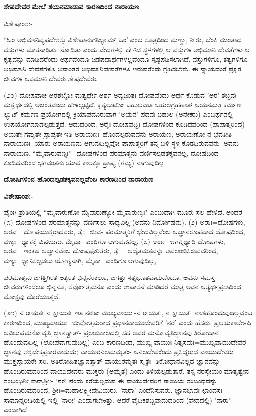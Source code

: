 \begin{center}
\textbf{ಶೇಷದೇವರ ಮೇಲೆ ಶಯನಮಾಡುವ ಕಾರಣದಿಂದ ನಾರಾಯಣ}
\end{center}

\noindent
ವಿಶೇಷಾಂಶ:-

“ಓಂ ಅಭಿಮಾನಿವ್ಯಪದೇಶಸ್ತು ವಿಶೇಷಾನುಗತಿಭ್ಯಾಮ್ ಓಂ' ಎಂಬ ಸೂತ್ರದಿಂದ ಮಣ್ಣು, ನೀರು, ಬೆಂಕಿ ಮುಂತಾದ ವಸ್ತುಗಳು ಮಾತನಾಡಿತು. ನೋಡಿತು ಎಂದು ವೇದಗಳಲ್ಲಿ ಹೇಳಿದ ಸ್ಥಳಗಳಲ್ಲಿ ಆ ವಸ್ತುಗಳ ಅಭಿಮಾನಿ ದೇವತೆಗಳು ಆ ಕೃತ್ಯವನ್ನು ಮಾಡಿದರೆಂದು ಅರ್ಥವೆಂದೂ ಜಡಪದಾರ್ಥಗಳಲ್ಲವೆಂದೂ ಸ್ಪಷ್ಟಪಡಿಸಲಾಗಿದೆ. ವಸ್ತುಗಳಿಗೂ, ತತ್ವಗಳಿಗೂ ಅಭಿಮಾನಿ ದೇವತೆಗಳೂ ಅವಾಂತರ ಅಭಿಮಾನಿದೇವತೆಗಳೂ ಇರುವರೆಂದು ಗ್ರಹಿಸಬೇಕು. ಈ ನ್ಯಾಯದಂತೆ ಪ್ರಕೃತ ಜೀವಗಳ ಅಭಿಮಾನಿ ದೇವರು ಶೇಷದೇವರು.

(೨೦) ದೋಷವಾಚ ಅರಶಬ್ದೋ ಮತ್ವರ್ಥೇ ಅರ್ಶ ಅದ್ಯಜಂತಃ-ದೋಷವೆಂದು ಅರ್ಥ ಕೊಡುವ 'ಅರ' ಶಬ್ದವು ಮತ್ವರ್ಥದಲ್ಲಿ ಅಜಂತವೆಂದು ಹೇಳಲ್ಪಟ್ಟಿದೆ. ಕೃತ್ಯಲುಟೋ ಬಹುಲಮಿತಿ ಬಹುಲಗ್ರಹಣಾತ್ ಅಯನಮಿತಿ ಕರ್ಮಣಿ ಲ್ಯುಟ್-ಕರ್ಮಣಿ ಪ್ರಯೋಗದಲ್ಲಿ ಕ್ರಿಯಾಪದವಿರುವಾಗ 'ಅಯನ' ಪದವು ಬಹುಲ (ಅನೇಕರು) ಎಂಬರ್ಥದಲ್ಲಿ ಉಪಯೋಗಮಾಡಲ್ಪಡುತ್ತದೆ. ಆದುದರಿಂದ, ಅರೈಃ ದೋಷವದ್ಭಿಃ-ದೋಷಗಳಿಂದ ಕೂಡಿದವರಿಂದ (ಪಾಪಾತ್ಮರಿಂದ) ಅಯತೇ ಗಮ್ಯತೇ ಪ್ರಾಪ್ಯತೇ ಇತಿ ಅರಾಯಣಃ--ಹೊಂದಲ್ಪಡುವವನು ಅರಾಯಣ, ಅರಾಯಣೋ ನ ಭವತೀತಿ ನಾರಾಯಣಃ- ಯಾರು ಅರಾಯಣನು ಆಗುವುದಿಲ್ಲವೋ-ಪಾಪಾತ್ಮರಿಗೆ ತನ್ನ ಬಳಿ ಸ್ಥಳ ಕೊಡದಿರುವವನು- ಅವನು ನಾರಾಯಣ. ``ಮೈವಾರುವಣ್ಯಃ''- ದೋಷಗಳಿಂದ ಪರಮಾತ್ಮನು ವರ್ಣಿಸಲ್ಪಡತಕ್ಕವನಲ್ಲ, ದೋಷದಿಂದ ಕೂಡಿದವರಿಂದ ಭಗವಂತನು ಯಾವ ಕಾಲಕ್ಕೂ ಪ್ರಾಪ್ಯ (ಗಮ್ಯ) ನಾಗುವುದಿಲ್ಲ.

\begin{center}
\textbf{ದೋಷಿಗಳಿಂದ ಹೊಂದಲ್ಪಡತಕ್ಕವನಲ್ಲವೆಂಬ ಕಾರಣದಿಂದ ನಾರಾಯಣ}
\end{center}

\noindent
\textbf{ವಿಶೇಷಾಂಶ:-}

ಪೈಂಗಿ ಶ್ರುತಿಯಲ್ಲಿ ``ಮೈವಾರುಣೋ ಮೈವಾರುಣ್ಯೋ ಮೈವಾರುಣ್ಯಃ" ಎಂಬುದಾಗಿ ಮೂರು ಸಲ ಹೇಳಿದೆ. ಅಂದರೆ (೧) ದೋಷಗಳಿಂದ ಪರಮಾತ್ಮನನ್ನು ವರ್ಣಿಸಲು ಸಾಧ್ಯವಿಲ್ಲ (ಅವನು ನಿರ್ದೋಷನು). (೨) ಅರಾಃ=ದೋಷಗಳು, ಅರವಃ=ದೋಷಯುಕ್ತರಾದವರು, ತೈಃ=ಜೀವ- ಪರಮಾತ್ಮರಿಗೆ ಭೇದವಿಲ್ಲವೆಂಬ ಅಜ್ಞಾನರೂಪವಾದ ದೋಷದಿಂದ, ವಣ್ಯಃ=ಧ್ಯಾನಕ್ಕೆ ವಿಷಯನು, ಮೈವಾ=ಎಂದಿಗೂ ಆಗುವವನಲ್ಲ. (೩) ಅರಾಃ=ಜಗನ್ನಿಥ್ಯಾದಿ ದೋಷಗಳು, ಅರವಃ=ಇಂತಹ ಅಜ್ಞಾನವೆಂಬ ದೋಷಪೂರಿತರು, ತೈಃ= ಅದೈತಮತವನ್ನು ಅವಲಂಬಿಸಿರುವವರಿಂದ, ವಣ್ಯಃ=ಧ್ಯಾನಿಸಲ್ಪಡಲು ಯೋಗ್ಯನಾಗಿ, ಮೈವಾ=ಎಂದಿಗೂ ಆಗುವುದಿಲ್ಲ,

ಪರಮಾತ್ಮನು ಜಗತ್ತಿಗಿಂತ ಅತ್ಯಂತ ಭಿನ್ನನೆಂತಲೂ, ಜಗತ್ತು ಸತ್ಯಭೂತವಾದುದೆಂದೂ, ಅವನು ಸಮಸ್ತ ಜೀವರುಗಳಿಂದಲೂ ಭಿನ್ನನೂ, ಸರ್ವೋತ್ತಮನೂ ಎಂದು ಉಪಾಸನೆ ಮಾಡಿದರೆ ಮಾತ್ರ ಅವನ ಅತ್ಯರ್ಥಪ್ರಸಾದಿಂದ ಮೋಕ್ಷವು ದೊರೆಯುತ್ತದೆ.

(೨೧) ನ ರೀಯತೇ ನ ಕ್ಷೀಯತೇ ಇತಿ ನರೋ ಮುಖ್ಯವಾಯುಃ-ನ ರೀಯತೇ, ನ ಕ್ಷೀಯತೆ=ನಾಶಹೊಂದುವುದಿಲ್ಲವೆಂಬ ಕಾರಣದಿಂದ, ಮುಖ್ಯವಾಯುಃ=ಜೀವೋತ್ತಮರಾದ ಪ್ರಧಾನವಾಯುದೇವರಿಗೆ 'ನರ' ಎಂದು ಹೆಸರು. ಪ್ರಲಯಕಾಲೇಽಪಿ ಅವಿಲುಪ್ತಮನೋವೃತ್ತಿ ಜ್ಞಾನತ್ವಾತ್- ಪ್ರಲಯಕಾಲದಲ್ಲಿ ಸಹ ಅವರ ಮನೋವೃತಿಜ್ಞಾನವು ತಿರೋಧಾನ ಹೊಂದುವುದಿಲ್ಲ (ಲೋಪವಾಗುವುದಿಲ್ಲ) ಎಂಬ ಕಾರಣದಿಂದ, ಮುಖ್ಯ ವಾಯುಃ ನಿತ್ಯಸಮಃ=ಮುಖ್ಯವಾಯುದೇವರ ಜ್ಞಾನವು ಶಶ್ವದೇಕಪ್ರಕಾರವಾದುದು; ವಾಯುರನಿಲಮಮೃತಂ- ಅನಿಲದೇವರೆಂದು ಪ್ರಸಿದ್ದರಾದ ವಾಯುದೇವರು ಮುಕ್ತಪ್ರಾಯರೇ ಸರಿ. ಅತಿರೋಹಿತಜ್ಞಾನತ್ವಾತ್ ವಾಯುರಮೃತಃ ಸ್ಮೃತಃ- ತಿರೋಧಾನವಿಲ್ಲದ ಜ್ಞಾನವನ್ನು ಹೊಂದಿರುವುದರಿಂದ ವಾಯುದೇವರು ಮುಕ್ತರು (ಅಮೃತ) ಎಂದು ತಿಳಿಯಲ್ಪಡುತಾರೆ. ತಸ್ಯ ನರಸ್ಯೇಯಂ ಮಾತೃತ್ವೇನ ಸಂಬಂಧಿನೀ ನಾರಾಶ‍್ರೀಃ- 'ನರ' ನೆಂದು ಕರೆಯಲ್ಪಡುವ ಈ ವಾಯುದೇವರಿಗೆ ತಾಯಿಯ ಸಂಬಂಧವನ್ನು ಹೊಂದಿರುವುದರಿಂದ, ಶ‍್ರೀಃ=ಮಹಾಲಕ್ಷ್ಮೀದೇವಿಯರು, 'ನಾರಾ' ಎಂದೆನಿಸುವರು. ಜ್ಞಾನಭಾವಃ ಛಾಂದಸಃ-ಸಾಮಾನ್ಯರೀತಿಯಲ್ಲಿ ಇಲ್ಲಿ 'ನಾರೀ' ಎಂದಾಗಬೇಕಿತ್ತು. ಆದರೆ ವೈದಿಕಶಬ್ದವಾದುದರಿಂದ (ವೇದದಲ್ಲಿ) 'ನಾರಾ' ಎಂದಾಗಿದೆ.

